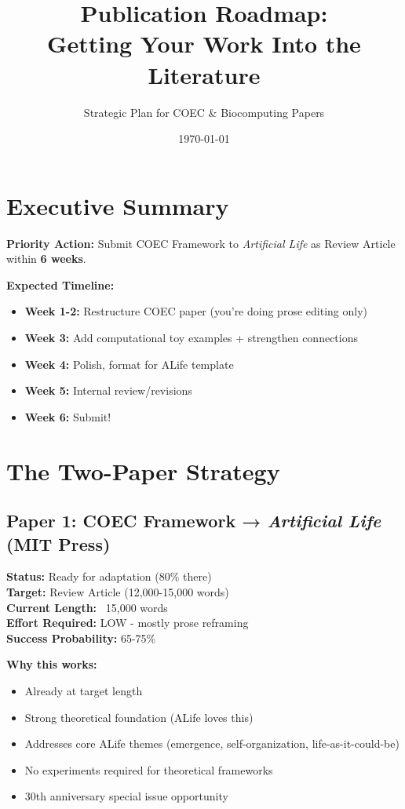 \documentclass[11pt]{article}
\title{\textbf{Publication Roadmap:\\Getting Your Work Into the Literature}}
\author{Strategic Plan for COEC \& Biocomputing Papers}
\date{\today}
\begin{document}
\maketitle

\section*{Executive Summary}

\textcolor{urgent}{\textbf{Priority Action:}} Submit COEC Framework to \textit{Artificial Life} as Review Article within \textbf{6 weeks}.

\textbf{Expected Timeline:}
\begin{itemize}[leftmargin=*]
    \item \textbf{Week 1-2:} Restructure COEC paper (you're doing prose editing only)
    \item \textbf{Week 3:} Add computational toy examples + strengthen connections
    \item \textbf{Week 4:} Polish, format for ALife template
    \item \textbf{Week 5:} Internal review/revisions
    \item \textbf{Week 6:} Submit!
\end{itemize}

\section{The Two-Paper Strategy}

\subsection{Paper 1: COEC Framework → \textit{Artificial Life} (MIT Press)}

\textbf{Status:} Ready for adaptation (80\% there)\\
\textbf{Target:} Review Article (12,000-15,000 words)\\
\textbf{Current Length:} ~15,000 words\\
\textbf{Effort Required:} \textcolor{normal}{LOW - mostly prose reframing}\\
\textbf{Success Probability:} \textcolor{normal}{65-75\%}

\textbf{Why this works:}
\begin{itemize}[leftmargin=*]
    \item Already at target length
    \item Strong theoretical foundation (ALife loves this)
    \item Addresses core ALife themes (emergence, self-organization, life-as-it-could-be)
    \item No experiments required for theoretical frameworks
    \item 30th anniversary special issue opportunity
\end{itemize}
\end{document}
